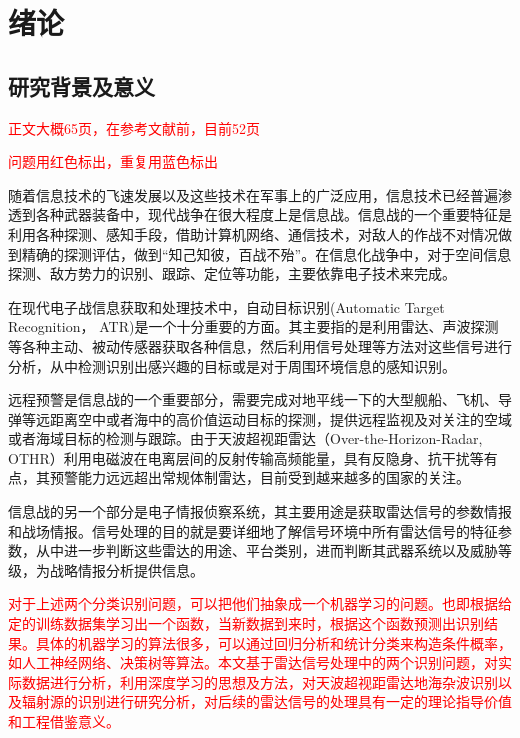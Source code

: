 \chapter{绪论}
\section{研究背景及意义}
\textcolor{red}{正文大概65页，在参考文献前，目前52页}

\textcolor{red}{问题用红色标出，重复用蓝色标出}

随着信息技术的飞速发展以及这些技术在军事上的广泛应用，信息技术已经普遍渗透到各种武器装备中，现代战争在很大程度上是信息战。信息战的一个重要特征是利用各种探测、感知手段，借助计算机网络、通信技术，对敌人的作战不对情况做到精确的探测评估，做到“知己知彼，百战不殆”。在信息化战争中，对于空间信息探测、敌方势力的识别、跟踪、定位等功能，主要依靠电子技术来完成\cite{顾耀平2006电子战发展趋势分析, 孙德海2003国外电子战发展综述及对我国电子战研究的思考, 炜森1996综合电子战新技术新方法, 孙纪尧2014电子战}。

在现代电子战信息获取和处理技术中，自动目标识别(Automatic Target Recognition， ATR)是一个十分重要的方面。其主要指的是利用雷达、声波探测等各种主动、被动传感器获取各种信息，然后利用信号处理等方法对这些信号进行分析，从中检测识别出感兴趣的目标或是对于周围环境信息的感知识别。

远程预警是信息战的一个重要部分，需要完成对地平线一下的大型舰船、飞机、导弹等远距离空中或者海中的高价值运动目标的探测，提供远程监视及对关注的空域或者海域目标的检测与跟踪。由于天波超视距雷达（Over-the-Horizon-Radar, OTHR）利用电磁波在电离层间的反射传输高频能量，具有反隐身、抗干扰等有点，其预警能力远远超出常规体制雷达，目前受到越来越多的国家的关注。

信息战的另一个部分是电子情报侦察系统，其主要用途是获取雷达信号的参数情报和战场情报。信号处理的目的就是要详细地了解信号环境中所有雷达信号的特征参数，从中进一步判断这些雷达的用途、平台类别，进而判断其武器系统以及威胁等级，为战略情报分析提供信息。

\textcolor{red}{对于上述两个分类识别问题，可以把他们抽象成一个机器学习的问题。也即根据给定的训练数据集学习出一个函数，当新数据到来时，根据这个函数预测出识别结果。具体的机器学习的算法很多，可以通过回归分析和统计分类来构造条件概率，如人工神经网络、决策树等算法。本文基于雷达信号处理中的两个识别问题，对实际数据进行分析，利用深度学习的思想及方法，对天波超视距雷达地海杂波识别以及辐射源的识别进行研究分析，对后续的雷达信号的处理具有一定的理论指导价值和工程借鉴意义。}
